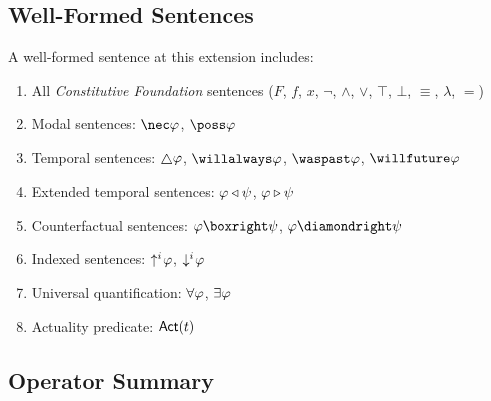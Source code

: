 \documentclass[../LogosReference.tex]{subfiles}
\begin{document}
\subsection{Well-Formed Sentences}\label{sec:well-formed-sentences}

A well-formed sentence at this extension includes:
\begin{enumerate}
  \item All \textit{Constitutive Foundation} sentences ($F$, $f$, $x$, $\neg$, $\land$, $\lor$, $\top$, $\bot$, $\equiv$, $\lambda$, $=$)
	\item Modal sentences: $\nec\metaA$, $\poss\metaA$
	\item Temporal sentences: $\always\metaA$, $\willalways\metaA$, $\waspast\metaA$, $\willfuture\metaA$
	\item Extended temporal sentences: $\varphi \triangleleft \psi$, $\varphi \triangleright \psi$
	\item Counterfactual sentences: $\metaA \boxright \metaB$, $\metaA \diamondright \metaB$
	\item Indexed sentences: $\uparrow^{i}\hspace{-2pt}\varphi$, $\downarrow^{i}\hspace{-2pt}\varphi$
	\item Universal quantification: $\forall\varphi$, $\exists\varphi$
	\item Actuality predicate: $\mathsf{Act}(t)$
\end{enumerate}


\subsection{Operator Summary}\label{sec:operator-summary}
\end{document}
